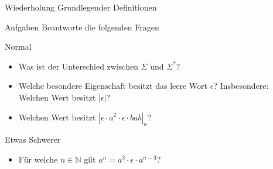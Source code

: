 
{
\begin{frame}[fragile]{Wiederholung Grundlegender Definitionen}
    \begin{alertblock}{Aufgaben}
        Beantworte die folgenden Fragen
    \end{alertblock}
    \begin{block}{Normal}
        \begin{itemize}
            \item Was ist der Unterschied zwischen $\Sigma$ und $\Sigma^*$?
            \item Welche besondere Eigenschaft besitzt das leere Wort $\epsilon$? Insbesondere: Welchen Wert besitzt $|\epsilon|$?
            \item Welchen Wert besitzt $|\epsilon \cdot a^2 \cdot \epsilon \cdot bab|_a$?
        \end{itemize}
    \end{block}
    \begin{block}{Etwas Schwerer}
        \begin{itemize}
            \item Für welche $n \in \mathbb{N}$ gilt $a^n = a^3 \cdot \epsilon \cdot a^{n-3}$?
        \end{itemize}
    \end{block}
\end{frame}
}

